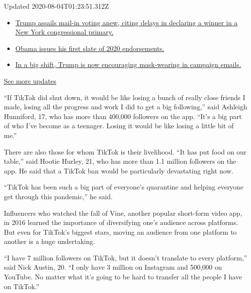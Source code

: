 Updated 2020-08-04T01:23:51.312Z

\begin{itemize}
\tightlist
\item
  \href{https://www.nytimes.com/2020/08/03/us/elections/biden-vs-trump.html?action=click\&pgtype=Article\&state=default\&region=MAIN_CONTENT_1\&context=storylines_live_updates\#link-6494b448}{Trump
  assails mail-in voting anew, citing delays in declaring a winner in a
  New York congressional primary.}
\item
  \href{https://www.nytimes.com/2020/08/03/us/elections/biden-vs-trump.html?action=click\&pgtype=Article\&state=default\&region=MAIN_CONTENT_1\&context=storylines_live_updates\#link-3de249e6}{Obama
  issues his first slate of 2020 endorsements.}
\item
  \href{https://www.nytimes.com/2020/08/03/us/elections/biden-vs-trump.html?action=click\&pgtype=Article\&state=default\&region=MAIN_CONTENT_1\&context=storylines_live_updates\#link-54e34d20}{In
  a big shift, Trump is now encouraging mask-wearing in campaign
  emails.}
\end{itemize}

\href{https://www.nytimes.com/2020/08/03/us/elections/biden-vs-trump.html?action=click\&pgtype=Article\&state=default\&region=MAIN_CONTENT_1\&context=storylines_live_updates}{See
more updates}

``If TikTok did shut down, it would be like losing a bunch of really
close friends I made, losing all the progress and work I did to get a
big following,'' said Ashleigh Hunniford, 17, who has more than 400,000
followers on the app. ``It's a big part of who I've become as a
teenager. Losing it would be like losing a little bit of me.''

There are also those for whom TikTok is their livelihood. ``It has put
food on our table,'' said Hootie Hurley, 21, who has more than 1.1
million followers on the app. He said that a TikTok ban would be
particularly devastating right now.

``TikTok has been such a big part of everyone's quarantine and helping
everyone get through this pandemic,'' he said.

Influencers who watched the fall of Vine, another popular short-form
video app, in 2016 learned the importance of diversifying one's audience
across platforms. But even for TikTok's biggest stars, moving an
audience from one platform to another is a huge undertaking.

``I have 7 million followers on TikTok, but it doesn't translate to
every platform,'' said Nick Austin, 20. ``I only have 3 million on
Instagram and 500,000 on YouTube. No matter what it's going to be hard
to transfer all the people I have on TikTok.''

